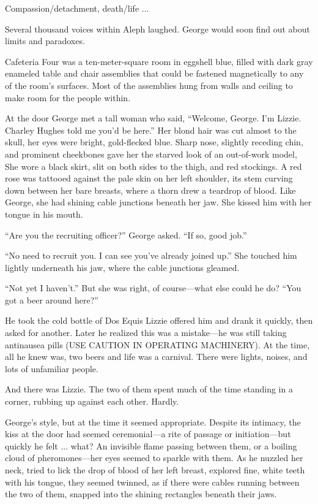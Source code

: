 Compassion/detachment, death/life ...

Several thousand voices within Aleph laughed. George would soon find out about limits and paradoxes.

Cafeteria Four was a ten-meter-square room in eggshell blue, filled with dark gray enameled table and chair assemblies that could be fastened magnetically to any of the room's surfaces. Most of the assemblies hung from walls and ceiling to make room for the people within.

At the door George met a tall woman who said, ``Welcome, George. I'm Lizzie. Charley Hughes told me you'd be here.'' Her blond hair was cut almost to the skull, her eyes were bright, gold-flecked blue. Sharp nose, slightly receding chin, and prominent cheekbones gave her the starved look of an out-of-work model, She wore a black skirt, slit on both sides to the thigh, and red stockings. A red rose was tattooed against the pale skin on her left shoulder, its stem curving down between her bare breasts, where a thorn drew a teardrop of blood. Like George, she had shining cable junctions beneath her jaw. She kissed him with her tongue in his mouth.

``Are you the recruiting officer?'' George asked. ``If so, good job.''

``No need to recruit you. I can see you've already joined up.'' She touched him lightly underneath his jaw, where the cable junctions gleamed.

``Not yet I haven't.'' But she was right, of course—what else could he do? ``You got a beer around here?''

He took the cold bottle of Dos Equis Lizzie offered him and drank it quickly, then asked for another. Later he realized this was a mistake—he was still taking antinausea pills (USE CAUTION IN OPERATING MACHINERY). At the time, all he knew was, two beers and life was a carnival. There were lights, noises, and lots of unfamiliar people.

And there was Lizzie. The two of them spent much of the time standing in a corner, rubbing up against each other. Hardly.

George's style, but at the time it seemed appropriate. Despite its intimacy, the kiss at the door had seemed ceremonial—a rite of passage or initiation—but quickly he felt ... what? An invisible flame passing between them, or a boiling cloud of pheromones—her eyes seemed to sparkle with them. As he nuzzled her neck, tried to lick the drop of blood of her left breast, explored fine, white teeth with his tongue, they seemed twinned, as if there were cables running between the two of them, snapped into the shining rectangles beneath their jaws.

